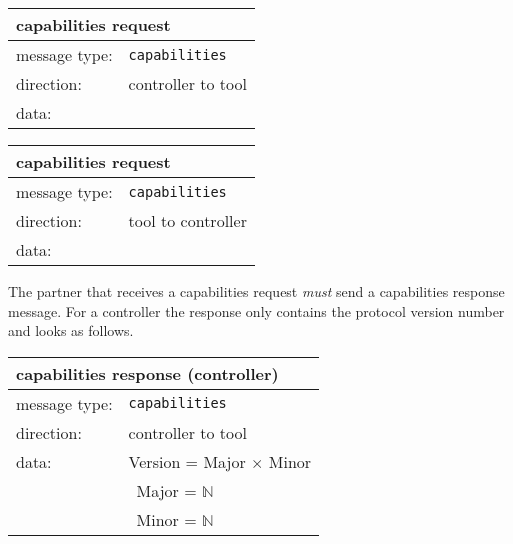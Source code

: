 \documentclass{article}
\newcommand{\msg}[1]{\texttt{#1}}
\begin{document}
   \begin{table}[H]
    \begin{center}
     \begin{tabular}{|ll|}
      \hline
       \multicolumn{2}{|l|}{\textbf{capabilities request}} \\
      \hline
       message type:    & \msg{capabilities} \\
      \hline
       direction:       & controller to tool \\
      \hline
       data:            & \\
      \hline
     \end{tabular}
     \begin{tabular}{|ll|}
      \hline
       \multicolumn{2}{|l|}{\textbf{capabilities request}} \\
      \hline
       message type:    & \msg{capabilities} \\
      \hline
       direction:       & tool to controller \\
      \hline
       data:            & \\
      \hline
     \end{tabular}
     \vspace{-0.5cm}
    \end{center}
   \end{table}

   \noindent The partner that receives a capabilities request \emph{must} send
   a capabilities response message. For a controller the response only contains
   the protocol version number and looks as follows.

   \begin{table}[H]
    \begin{center}
     \begin{tabular}{|ll|}
      \hline
       \multicolumn{2}{|l|}{\textbf{capabilities response (controller)}} \\
      \hline
       message type:   & \msg{capabilities} \\
      \hline
       direction:      & controller to tool \\
      \hline
       data:           & Version = Major $\times$ Minor \\
                       & \ Major = $\mathbb{N}$ \\
                       & \ Minor = $\mathbb{N}$ \\
      \hline
     \end{tabular}
    \end{center}
    \vspace{-0.5cm}
   \end{table}
\end{document}
